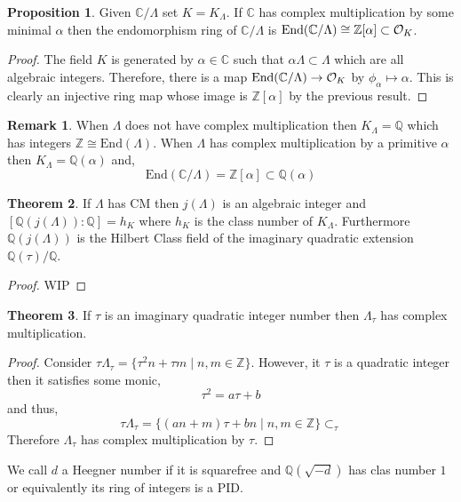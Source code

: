 \documentclass{article}
\newcommand{\End}[0]{\mathrm{End}}
\newcommand{\Z}{\mathbb{Z}}
\newcommand{\Q}{\mathbb{Q}}
\newcommand{\C}{\mathbb{C}}
\theoremstyle{definition}
\newtheorem{theorem}{Theorem}[section]
\newtheorem{proposition}[theorem]{Proposition}
\newtheorem{remark}{Remark}[section]
\newenvironment{definition}[1][Definition:]{\begin{trivlist}
\item[\hskip \labelsep {\bfseries #1}]}{\end{trivlist}}
\begin{document}
\begin{proposition}
Given $\C / \Lambda$ set $K = K_\Lambda$. If $\C$ has complex multiplication by some minimal $\alpha$ then the endomorphism ring of $\C / \Lambda$ is $\End{(\C / \Lambda)} \cong \Z[\alpha] \subset \ints{K}$. 
\end{proposition} 

\begin{proof}
The field $K$ is generated by $\alpha \in \C$ such that $\alpha \Lambda \subset \Lambda$ which are all algebraic integers. Therefore, there is a map $\End{(\C / \Lambda)} \to \ints{K}$ by $\phi_\alpha \mapsto \alpha$. This is clearly an injective ring map whose image is $\Z[\alpha]$ by the previous result.
\end{proof}

\begin{remark}
When $\Lambda$ does not have complex multiplication then $K_\Lambda = \Q$ which has integers $\Z \cong \End{(\Lambda)}$. When $\Lambda$ has complex multiplication by a primitive $\alpha$ then $K_\Lambda = \Q(\alpha)$ and, 
\[ \End{(\C / \Lambda)} = \Z[\alpha] \subset \Q(\alpha) \]
\end{remark}

\begin{theorem}
If $\Lambda$ has CM then $j(\Lambda)$ is an algebraic integer and $[\Q(j(\Lambda)) : \Q] = h_K$ where $h_K$ is the class number of $K_\Lambda$. Furthermore $\Q(j(\Lambda))$ is the Hilbert Class field of the imaginary quadratic extension $\Q(\tau) / \Q$.
\end{theorem}

{\color{red}
\begin{proof}
WIP
\end{proof}
}

\begin{theorem}
If $\tau$ is an imaginary quadratic integer number then $\Lambda_\tau$ has complex multiplication.
\end{theorem}

\begin{proof}
Consider $\tau \Lambda_\tau = \{ \tau^2 n + \tau m \mid n, m \in \Z \}$. However, it $\tau$ is a quadratic integer then it satisfies some monic,
\[ \tau^2 = a \tau + b \]
and thus,
\[ \tau \Lambda_\tau = \{  (a n + m) \tau + bn \mid n, m \in \Z \} \subset_{\tau} \]
Therefore $\Lambda_\tau$ has complex multiplication by $\tau$. 
\end{proof}

\begin{definition}
We call $d$ a Heegner number if it is squarefree and $\Q(\sqrt{-d})$ has clas number $1$ or equivalently its ring of integers is a PID.
\end{definition}
\end{document}
